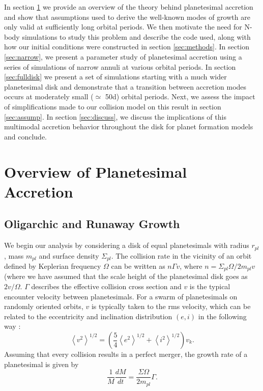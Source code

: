 \documentclass[twocolumn]{aastex63}
\begin{document}
In section \ref{sec:theory} we provide an overview of the theory
behind planetesimal accretion and show that assumptions used to derive
the well-known modes of growth are only valid at sufficiently long
orbital periods. We then motivate the need for N-body simulations to
study this problem and describe the code used, along with how our
initial conditions were constructed in section \ref{sec:methods}. In
section \ref{sec:narrow}, we present a parameter study of planetesimal
accretion using a series of simulations of narrow annuli at various
orbital periods. In section \ref{sec:fulldisk} we present a set of simulations starting with a much wider planetesimal disk and demonstrate that a transition between accretion modes occurs at moderately small ($\simeq$ 50d) orbital periods. Next, we assess the impact of simplifications made to our collision model on this result in section \ref{sec:assump}. In section \ref{sec:discuss}, we discuss the implications of this multimodal accretion behavior throughout the disk for planet formation models and conclude.

\section{Overview of Planetesimal Accretion}\label{sec:theory}

\subsection{Oligarchic and Runaway Growth}

We begin our analysis by considering a disk of equal planetesimals
with radius $r_{pl}$, mass $m_{pl}$ and surface density
$\Sigma_{pl}$. The collision rate in the vicinity of an orbit defined
by Keplerian frequency $\Omega$ can be written as $n \Gamma v$, where
$n = \Sigma_{pl} \Omega / 2 m_{pl} v$ (where we have assumed that the scale height of the planetesimal disk goes as $2v/\Omega$. $\Gamma$ describes the effective
collision cross section and $v$ is the typical encounter velocity
between planetesimals.
For a swarm of planetesimals on randomly oriented orbits, $v$ is typically
taken to the rms velocity, which can be related to the eccentricity and inclination distribution $(e, i)$ in the following way \citep{lissauer93}:
\begin{equation}\label{eq:ecc_vel}
	\left< v^{2} \right>^{1/2} = \left( \frac{5}{4} \left< e^{2} \right>^{1/2} + \left< i^{2} \right>^{1/2}  \right) v_{k}.
\end{equation}
Assuming that every collision results in a perfect merger, the growth rate of a planetesimal is given by
\begin{equation}\label{eq:growth}
	\frac{1}{M}\frac{dM}{dt} = \frac{\Sigma \Omega}{2 m_{pl}} \Gamma.
\end{equation}
\end{document}
